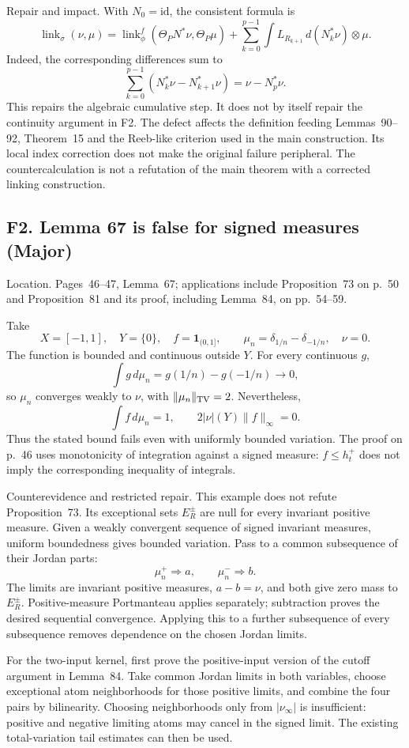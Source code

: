 \documentclass[10pt]{article}
\begin{document}
Repair and impact. With \(N_0=\mathrm{id}\), the consistent formula is \[\operatorname{link}_\sigma(\nu,\mu)
 =\operatorname{link}_\phi^f(\Theta_PN^*\nu,\Theta_P\mu)
 +\sum_{k=0}^{p-1}\int L_{R_{k+1}}\,d(N_k^*\nu)\otimes\mu.\] Indeed, the corresponding differences sum to \[\sum_{k=0}^{p-1}(N_k^*\nu-N_{k+1}^*\nu)=\nu-N_p^*\nu.\] This repairs the algebraic cumulative step. It does not by itself repair the continuity argument in F2. The defect affects the definition feeding Lemmas 90–92, Theorem 15 and the Reeb-like criterion used in the main construction. Its local index correction does not make the original failure peripheral. The countercalculation is not a refutation of the main theorem with a corrected linking construction.\par
\subsection*{F2. Lemma 67 is false for signed measures (Major)}
Location. Pages 46–47, Lemma 67; applications include Proposition 73 on p. 50 and Proposition 81 and its proof, including Lemma 84, on pp. 54–59.\par
Take \[X=[-1,1],\quad Y=\{0\},\quad f=\mathbf1_{(0,1]},\qquad
 \mu_n=\delta_{1/n}-\delta_{-1/n},\quad \nu=0.\] The function is bounded and continuous outside \(Y\). For every continuous \(g\), \[\int g\,d\mu_n=g(1/n)-g(-1/n)\longrightarrow0,\] so \(\mu_n\) converges weakly to \(\nu\), with \(\|\mu_n\|_{\rm TV}=2\). Nevertheless, \[\int f\,d\mu_n=1,\qquad
 2|\nu|(Y)\|f\|_\infty=0.\] Thus the stated bound fails even with uniformly bounded variation. The proof on p. 46 uses monotonicity of integration against a signed measure: \(f\le h_t^+\) does not imply the corresponding inequality of integrals.\par
Counterevidence and restricted repair. This example does not refute Proposition 73. Its exceptional sets \(E_R^\pm\) are null for every invariant positive measure. Given a weakly convergent sequence of signed invariant measures, uniform boundedness gives bounded variation. Pass to a common subsequence of their Jordan parts: \[\mu_n^+\Rightarrow a,\qquad \mu_n^-\Rightarrow b.\] The limits are invariant positive measures, \(a-b=\nu\), and both give zero mass to \(E_R^\pm\). Positive-measure Portmanteau applies separately; subtraction proves the desired sequential convergence. Applying this to a further subsequence of every subsequence removes dependence on the chosen Jordan limits.\par
For the two-input kernel, first prove the positive-input version of the cutoff argument in Lemma 84. Take common Jordan limits in both variables, choose exceptional atom neighborhoods for those positive limits, and combine the four pairs by bilinearity. Choosing neighborhoods only from \(|\nu_\infty|\) is insufficient: positive and negative limiting atoms may cancel in the signed limit. The existing total-variation tail estimates can then be used.\par
\end{document}
